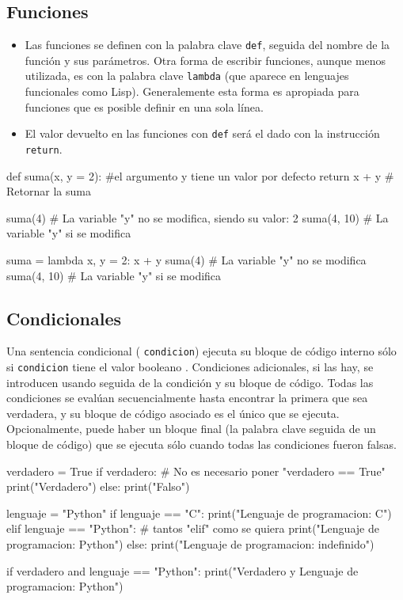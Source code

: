 \subsection{Funciones}
\begin{itemize}

  \item  Las funciones se definen con la palabra clave \verb~def~, seguida del nombre de
  la función y sus parámetros. 
  Otra forma de escribir funciones, aunque menos utilizada, es con la palabra clave \verb~lambda~ (que aparece en lenguajes funcionales como Lisp). Generalemente esta forma es apropiada para funciones que es posible definir en una sola línea.
  
  
  \item  El valor devuelto en las funciones con \verb~def~ será el dado con la instrucción \verb~return~.
  \end{itemize}


\begin{pyconsole}
def suma(x, y = 2): #el argumento y tiene un valor por defecto
    return x + y # Retornar la suma

suma(4) # La variable "y" no se modifica, siendo su valor: 2
suma(4, 10) # La variable "y" si se modifica
\end{pyconsole}


\begin{pyconsole}
suma = lambda x, y = 2: x + y
suma(4) # La variable "y" no se modifica
suma(4, 10) # La variable "y" si se modifica
\end{pyconsole}

\subsection{Condicionales}
 Una sentencia condicional ( \verb~condicion~) ejecuta su bloque de código interno 
 sólo si \verb~condicion~ tiene el valor booleano .  Condiciones adicionales, si las hay, se introducen usando  seguida de la condición y su bloque de código. Todas las condiciones se evalúan secuencialmente hasta encontrar la primera que sea verdadera, y su bloque de código asociado es el único que se ejecuta. Opcionalmente, puede haber un bloque final (la palabra clave  seguida de un bloque de código) que se ejecuta sólo cuando todas las condiciones fueron falsas.



\begin{pyconsole}
verdadero = True
if verdadero: # No es necesario poner "verdadero == True"
    print("Verdadero")
else:
    print("Falso")

lenguaje = "Python"
if lenguaje == "C": 
    print("Lenguaje de programacion: C")
elif lenguaje == "Python": # tantos "elif" como se quiera
    print("Lenguaje de programacion: Python")
else: 
    print("Lenguaje de programacion: indefinido")

if verdadero and lenguaje == "Python": 
    print("Verdadero y Lenguaje de programacion: Python")

\end{pyconsole}






